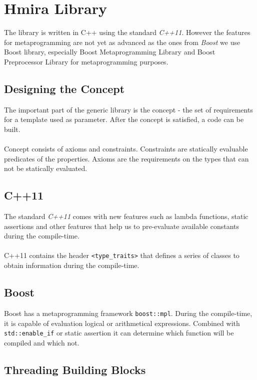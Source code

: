 \chapter{Hmira Library}

The library is written in C++ using the standard \emph{C++11}\cite{Naugler2013}. However the features
for metaprogramming are not yet as advanced as the ones from \emph{Boost}\cite{Abrahams2004} we
use Boost library, especially Boost Metaprogramming Library\cite{bmpl}
and Boost Preprocessor Library\cite{bpl} for metaprogramming purposes.

\section{Designing the Concept}

The important part of the generic library is the concept - the set of requirements for a template
used as parameter. After the concept is satisfied, a code can be built.\\
\\
Concept consists of axioms and constraints\cite{Sutton2012}. Constraints are statically evaluable
predicates of the properties. Axioms are the requirements on the types that can not be statically
evaluated.

\section{C++11}

The standard \emph{C++11} comes with new features such as lambda functions, static assertions and other
features that help us to pre-evaluate available constants during the compile-time.\\
\\
C++11 contains the header \texttt{\textless type\_traits\textgreater} that defines
a series of classes to obtain information during the compile-time.

\section{Boost}

Boost has a metaprogramming framework \texttt{boost::mpl}\cite{bmpl}. During the compile-time, it is
capable of evaluation logical or arithmetical expressions. Combined with \texttt{std::enable\_if}
or static assertion it can determine which function will be compiled and which not.

\section{Threading Building Blocks}

